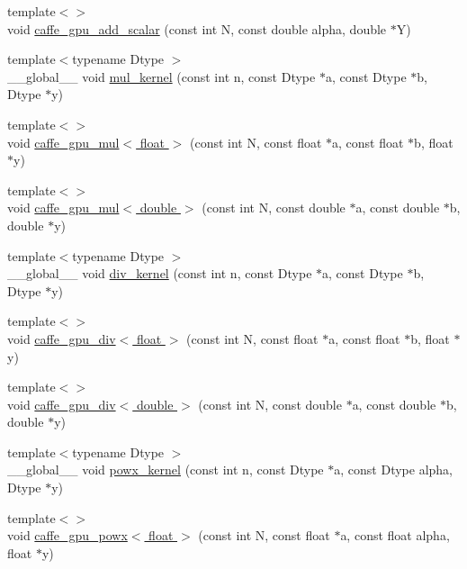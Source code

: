 \begin{DoxyCompactItemize}
\item 
{\footnotesize template$<$$>$ }\\void \hyperlink{namespacecaffe_a9d6e8b8173c0c8c4d0125082281ff529}{caffe\+\_\+gpu\+\_\+add\+\_\+scalar} (const int N, const double alpha, double $\ast$Y)
\item 
{\footnotesize template$<$typename Dtype $>$ }\\\+\_\+\+\_\+global\+\_\+\+\_\+ void \hyperlink{namespacecaffe_a2b2ad9026c6ca682e92ac7f06b2c1720}{mul\+\_\+kernel} (const int n, const Dtype $\ast$a, const Dtype $\ast$b, Dtype $\ast$y)
\item 
{\footnotesize template$<$$>$ }\\void \hyperlink{namespacecaffe_a96fc8a04e62e3f2ffdd79d5600262f0b}{caffe\+\_\+gpu\+\_\+mul$<$ float $>$} (const int N, const float $\ast$a, const float $\ast$b, float $\ast$y)
\item 
{\footnotesize template$<$$>$ }\\void \hyperlink{namespacecaffe_a6944cc28fe65abfa6cec8b8dc7aea26d}{caffe\+\_\+gpu\+\_\+mul$<$ double $>$} (const int N, const double $\ast$a, const double $\ast$b, double $\ast$y)
\item 
{\footnotesize template$<$typename Dtype $>$ }\\\+\_\+\+\_\+global\+\_\+\+\_\+ void \hyperlink{namespacecaffe_aafc93f3ad4961c88d19ba574112250a8}{div\+\_\+kernel} (const int n, const Dtype $\ast$a, const Dtype $\ast$b, Dtype $\ast$y)
\item 
{\footnotesize template$<$$>$ }\\void \hyperlink{namespacecaffe_ab16bf45f3c2b83f59c1991960bf23c2f}{caffe\+\_\+gpu\+\_\+div$<$ float $>$} (const int N, const float $\ast$a, const float $\ast$b, float $\ast$y)
\item 
{\footnotesize template$<$$>$ }\\void \hyperlink{namespacecaffe_aa65bd487aa7c59bf85dfa626dae789c8}{caffe\+\_\+gpu\+\_\+div$<$ double $>$} (const int N, const double $\ast$a, const double $\ast$b, double $\ast$y)
\item 
{\footnotesize template$<$typename Dtype $>$ }\\\+\_\+\+\_\+global\+\_\+\+\_\+ void \hyperlink{namespacecaffe_a9e8f995a5fe430af483f934f6db51ac8}{powx\+\_\+kernel} (const int n, const Dtype $\ast$a, const Dtype alpha, Dtype $\ast$y)
\item 
{\footnotesize template$<$$>$ }\\void \hyperlink{namespacecaffe_a5a3244754d20c867f7c3c0e13ede7b86}{caffe\+\_\+gpu\+\_\+powx$<$ float $>$} (const int N, const float $\ast$a, const float alpha, float $\ast$y)

\end{DoxyCompactItemize}
